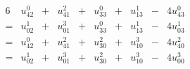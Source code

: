 \begin{alignat*}{6} 
	& u_{42}^0 & {}+{} &  u_{41}^2 & {}+{} &  u_{33}^0 & {}+{} &  u_{13}^1 & {}-{} &  4u_{43}^0\\
	{}={} & u_{02}^1 & {}+{} &  u_{01}^3 & {}+{} &  u_{33}^0 & {}+{} &  u_{13}^1 & {}-{} &  4u_{03}^1\\
	{}={} & u_{42}^0 & {}+{} &  u_{41}^2 & {}+{} &  u_{30}^2 & {}+{} &  u_{10}^3 & {}-{} &  4u_{40}^2\\
	{}={} & u_{02}^1 & {}+{} &  u_{01}^3 & {}+{} &  u_{30}^2 & {}+{} &  u_{10}^3 & {}-{} &  4u_{00}^3
\end{alignat*}